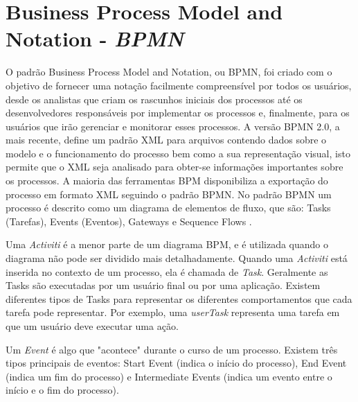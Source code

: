 \documentclass[12pt]{article}
\begin{document}
\section{Business Process Model and Notation - \emph{BPMN}}
O padrão Business Process Model and Notation, ou BPMN, foi criado com o objetivo de fornecer uma notação facilmente compreensível por todos os usuários, desde os analistas que criam os rascunhos iniciais dos processos até os desenvolvedores responsáveis por implementar os processos e, finalmente, para os usuários que irão gerenciar e monitorar esses processos\cite{model2011notation}. A versão BPMN 2.0, a mais recente, define um padrão XML para arquivos contendo dados sobre o modelo e o funcionamento do processo bem como a sua representação visual\cite{kurzdiagram}, isto permite que o XML seja analisado para obter-se informações importantes sobre os processos. A maioria das ferramentas BPM disponibiliza a exportação do processo em formato XML seguindo o padrão BPMN. No padrão BPMN um processo é descrito como um diagrama de elementos de fluxo, que são: Tasks (Tarefas), Events (Eventos), Gateways e Sequence Flows \cite{kurzdiagram}.



Uma \emph{Activiti} é a menor parte de um diagrama BPM, e é utilizada quando o diagrama não pode ser dividido mais detalhadamente. Quando uma \emph{Activiti} está inserida no contexto de um processo, ela é chamada de \emph{Task}. Geralmente as Tasks são executadas por um usuário final ou por uma aplicação. Existem diferentes tipos de Tasks para representar os diferentes comportamentos que cada tarefa pode representar. Por exemplo, uma \emph{userTask} representa uma tarefa em que um usuário deve executar uma ação.

Um \emph{Event} é algo que "acontece" durante o curso de um processo\cite{model2011notation}. Existem três tipos principais de eventos: Start Event (indica o início do processo), End Event (indica um fim do processo) e Intermediate Events (indica um evento entre o início e o fim do processo).
\end{document}
